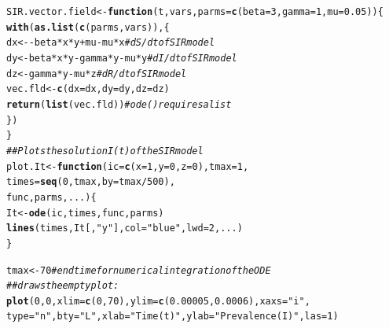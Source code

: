 \documentclass[12pt]{article}\usepackage[]{graphicx}\usepackage[]{color}
\makeatletter
\newcommand{\hlnum}[1]{\textcolor[rgb]{0.686,0.059,0.569}{#1}}%
\newcommand{\hlstr}[1]{\textcolor[rgb]{0.192,0.494,0.8}{#1}}%
\newcommand{\hlcom}[1]{\textcolor[rgb]{0.678,0.584,0.686}{\textit{#1}}}%
\newcommand{\hlopt}[1]{\textcolor[rgb]{0,0,0}{#1}}%
\newcommand{\hlstd}[1]{\textcolor[rgb]{0.345,0.345,0.345}{#1}}%
\newcommand{\hlkwa}[1]{\textcolor[rgb]{0.161,0.373,0.58}{\textbf{#1}}}%
\newcommand{\hlkwb}[1]{\textcolor[rgb]{0.69,0.353,0.396}{#1}}%
\newcommand{\hlkwc}[1]{\textcolor[rgb]{0.333,0.667,0.333}{#1}}%
\newcommand{\hlkwd}[1]{\textcolor[rgb]{0.737,0.353,0.396}{\textbf{#1}}}%
\newenvironment{kframe}{%
 \def\at@end@of@kframe{}%
 \ifinner\ifhmode%
  \def\at@end@of@kframe{\end{minipage}}%
  \begin{minipage}{\columnwidth}%
 \fi\fi%
 \def\FrameCommand##1{\hskip\@totalleftmargin \hskip-\fboxsep
 \colorbox{shadecolor}{##1}\hskip-\fboxsep
     \hskip-\linewidth \hskip-\@totalleftmargin \hskip\columnwidth}%
 \MakeFramed {\advance\hsize-\width
   \@totalleftmargin\z@ \linewidth\hsize
   \@setminipage}}%
 {\par\unskip\endMakeFramed%
 \at@end@of@kframe}
\newenvironment{knitrout}{}{} %
\makeatother
\begin{document}
\begin{enumerate}[(a)]
\begin{knitrout}
\color{fgcolor}\begin{kframe}
\begin{alltt}
\hlstd{SIR.vector.field} \hlkwb{<-} \hlkwa{function}\hlstd{(}\hlkwc{t}\hlstd{,} \hlkwc{vars}\hlstd{,} \hlkwc{parms}\hlstd{=}\hlkwd{c}\hlstd{(}\hlkwc{beta}\hlstd{=}\hlnum{3}\hlstd{,}\hlkwc{gamma}\hlstd{=}\hlnum{1}\hlstd{,} \hlkwc{mu}\hlstd{=}\hlnum{0.05}\hlstd{)) \{}
\hlkwd{with}\hlstd{(}\hlkwd{as.list}\hlstd{(}\hlkwd{c}\hlstd{(parms, vars)), \{}
\hlstd{dx} \hlkwb{<-} \hlopt{-}\hlstd{beta}\hlopt{*}\hlstd{x}\hlopt{*}\hlstd{y} \hlopt{+} \hlstd{mu} \hlopt{-} \hlstd{mu}\hlopt{*}\hlstd{x} \hlcom{# dS/dt of SIR model}
\hlstd{dy} \hlkwb{<-} \hlstd{beta}\hlopt{*}\hlstd{x}\hlopt{*}\hlstd{y} \hlopt{-} \hlstd{gamma}\hlopt{*}\hlstd{y} \hlopt{-} \hlstd{mu}\hlopt{*}\hlstd{y} \hlcom{# dI/dt of SIR model}
\hlstd{dz} \hlkwb{<-} \hlstd{gamma}\hlopt{*}\hlstd{y} \hlopt{-} \hlstd{mu}\hlopt{*}\hlstd{z} \hlcom{#dR/dt of SIR model}
\hlstd{vec.fld} \hlkwb{<-} \hlkwd{c}\hlstd{(}\hlkwc{dx}\hlstd{=dx,} \hlkwc{dy}\hlstd{=dy,} \hlkwc{dz}\hlstd{=dz)}
\hlkwd{return}\hlstd{(}\hlkwd{list}\hlstd{(vec.fld))} \hlcom{# ode() requires a list}
\hlstd{\})}
\hlstd{\}}
\hlcom{##Plots the solution I(t) of the SIR model}
\hlstd{plot.It} \hlkwb{<-} \hlkwa{function}\hlstd{(}\hlkwc{ic}\hlstd{=}\hlkwd{c}\hlstd{(}\hlkwc{x}\hlstd{=}\hlnum{1}\hlstd{,}\hlkwc{y}\hlstd{=}\hlnum{0}\hlstd{,}\hlkwc{z}\hlstd{=}\hlnum{0}\hlstd{),} \hlkwc{tmax}\hlstd{=}\hlnum{1}\hlstd{,}
\hlkwc{times}\hlstd{=}\hlkwd{seq}\hlstd{(}\hlnum{0}\hlstd{,tmax,}\hlkwc{by}\hlstd{=tmax}\hlopt{/}\hlnum{500}\hlstd{),}
\hlkwc{func}\hlstd{,} \hlkwc{parms}\hlstd{,} \hlkwc{...} \hlstd{) \{}
\hlstd{It} \hlkwb{<-} \hlkwd{ode}\hlstd{(ic, times, func, parms)}
\hlkwd{lines}\hlstd{(times, It[,}\hlstr{"y"}\hlstd{],} \hlkwc{col}\hlstd{=}\hlstr{"blue"}\hlstd{,} \hlkwc{lwd}\hlstd{=}\hlnum{2}\hlstd{, ... )}
\hlstd{\}}

\hlstd{tmax} \hlkwb{<-} \hlnum{70} \hlcom{# end time for numerical integration of the ODE}
\hlcom{## draws the empty plot:}
\hlkwd{plot}\hlstd{(}\hlnum{0}\hlstd{,}\hlnum{0}\hlstd{,}\hlkwc{xlim}\hlstd{=}\hlkwd{c}\hlstd{(}\hlnum{0}\hlstd{,}\hlnum{70}\hlstd{),}\hlkwc{ylim}\hlstd{=}\hlkwd{c}\hlstd{(}\hlnum{0.00005}\hlstd{,}\hlnum{0.0006}\hlstd{),} \hlkwc{xaxs}\hlstd{=}\hlstr{"i"}\hlstd{,}
\hlkwc{type}\hlstd{=}\hlstr{"n"}\hlstd{,}\hlkwc{bty}\hlstd{=}\hlstr{"L"}\hlstd{,}\hlkwc{xlab}\hlstd{=}\hlstr{"Time (t)"}\hlstd{,}\hlkwc{ylab}\hlstd{=}\hlstr{"Prevalence (I)"}\hlstd{,}\hlkwc{las}\hlstd{=}\hlnum{1}\hlstd{)}


\end{alltt}
\end{kframe}
\end{knitrout}
\end{enumerate}
\end{document}
